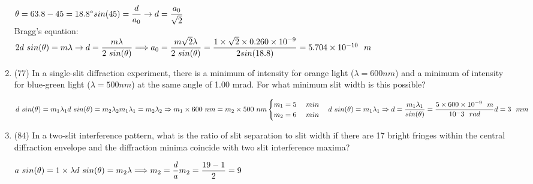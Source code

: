 \documentclass[fleqn]{article}
\begin{document}
\begin{enumerate}
      \textcolor{hwColor}{ 
        $
          \theta=63.8-45=18.8^\circ \\
          sin(45)=\dfrac{d}{a_0} \rightarrow d=\dfrac{a_0}{\sqrt{2}} \\
        $ \\
        Bragg's equation: \\
        $
          2d~sin(\theta)=m \lambda \rightarrow d=\dfrac{m \lambda}{2~sin(\theta)} \\
          \Longrightarrow a_0=\dfrac{m \sqrt{2} \lambda}{2~sin(\theta)}=\dfrac{1 \times \sqrt{2} \times 0.260 \times 10^{-9}}{2 sin(18.8)}=5.704 \times 10^{-10} ~~ m
        $
      }

    \item (77) In a single-slit diffraction experiment, there is a minimum of intensity for orange light ($\lambda=600 nm$) and a minimum of intensity for blue-green light ($\lambda=500 nm$) at the same angle of 1.00 mrad. For what minimum slit width is this possible?

      \textcolor{hwColor}{ 
        $
          d~sin(\theta)=m_1 \lambda_1 \\
          d~sin(\theta)=m_2 \lambda_2 \\
          m_1 \lambda_1=m_2 \lambda_2 \Rightarrow m_1 \times 600~nm=m_2 \times 500~nm \\
          \begin{cases}
            m_1=5 ~~~~ min \\
            m_2=6 ~~~~ min \\
          \end{cases} \\
          d~sin(\theta)=m_1 \lambda_1 \Rightarrow d=\dfrac{m_1 \lambda_1}{sin(\theta)}=\dfrac{5 \times 600 \times 10^{-9} ~~ m}{10^-3 ~~ rad} \\
          d=3 ~~ mm
        $
      }


    \item (84) In a two-slit interference pattern, what is the ratio of slit separation to slit width if there are 17 bright fringes within the central diffraction envelope and the diffraction minima coincide with two slit interference maxima?

      \textcolor{hwColor}{ 
        $
          a~sin(\theta)=1 \times \lambda \\
          d~sin(\theta)=m_2 \lambda \\
          \Longrightarrow m_2=\dfrac{d}{a} \\
          \\
          m_2=\dfrac{19-1}{2}=9
        $
      }


\end{enumerate}
\end{document}
